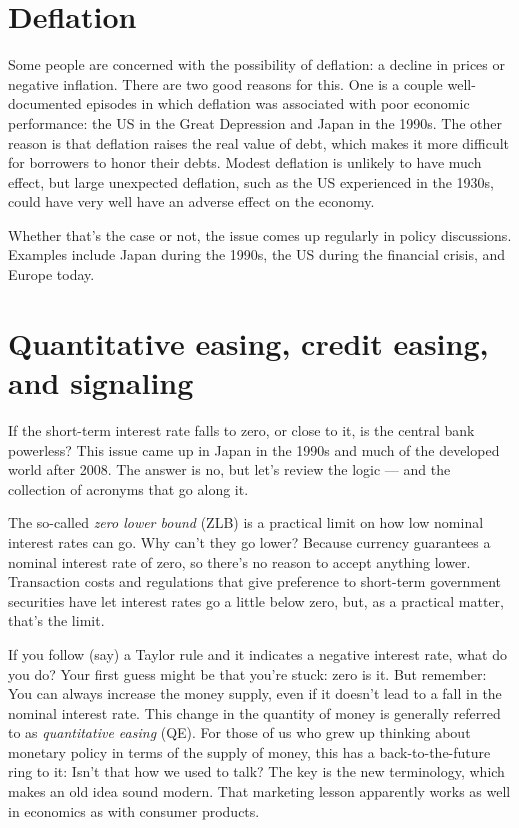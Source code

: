 \section{Deflation} 

Some people are concerned with the possibility of deflation:  
a decline in prices or negative inflation.  
There are two good reasons for this.  
One is a couple well-documented episodes in which deflation was associated
with poor economic performance:
the US in the Great Depression and Japan in the 1990s.  
The other reason is that deflation raises the real value of debt, 
which makes it more difficult for borrowers to honor their debts.  
Modest deflation is unlikely to have much effect, 
but large unexpected deflation, such as the US experienced in the 1930s, 
could have very well have an adverse effect on the economy. 

Whether that's the case or not, the issue comes up regularly in policy discussions.
Examples include Japan during the 1990s, the US during the financial crisis, 
and Europe today. 


\section{Quantitative easing, credit easing, and signaling} 

If the short-term interest rate falls to zero, or close to it,
is the central bank  powerless?
This issue came up in Japan in the 1990s and
much of the developed world after 2008.
The answer is no, but let's review the logic --- and the collection of acronyms that go along it.

The so-called {\it zero lower bound\/} (ZLB) is a practical
limit on how low nominal interest rates can go.
Why can't they go lower?
Because currency guarantees a nominal interest rate of zero,
so there's no reason to accept anything lower.
Transaction costs and regulations that give preference
to short-term government securities have let interest rates
go a little below zero, but, as a practical matter, that's the limit.

If you follow (say) a Taylor rule and it indicates a negative interest rate,
what do you do?
Your first guess might be that you're stuck:  zero is it.
But remember:  You can always increase the money supply,
even if it doesn't lead to a fall in the nominal interest rate.
This change in the quantity of money is generally referred to as
{\it   quantitative easing \/} (QE).
For those of us who grew up thinking about monetary policy in
terms of the supply of money,
this has a back-to-the-future ring to it:
Isn't that how we used to talk?
The key is the new terminology,
which makes an old idea sound modern.
That marketing lesson apparently works as well in economics
as with consumer products.

